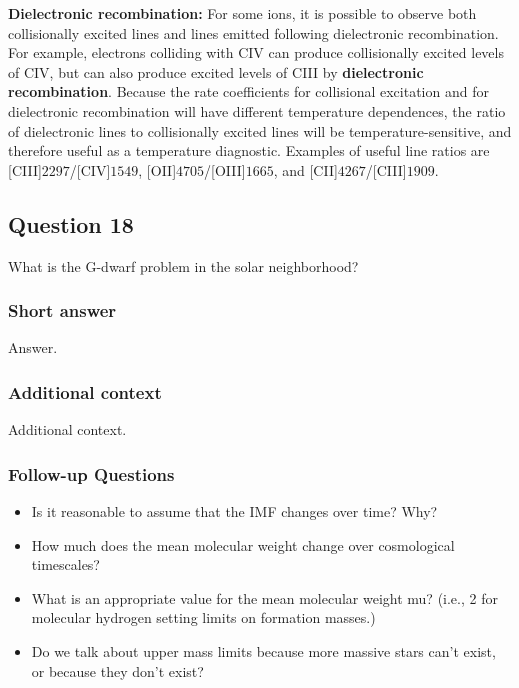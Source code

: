 \documentclass[a4paper,10pt]{article}
\begin{document}
{\noindent}\textbf{Dielectronic recombination:} For some ions, it is possible to observe both collisionally excited lines and lines emitted following dielectronic recombination. For example, electrons colliding with CIV can produce collisionally excited levels of CIV, but can also produce excited levels of CIII by \textbf{dielectronic recombination}. Because the rate coefficients for collisional excitation and for dielectronic recombination will have different temperature dependences, the ratio of dielectronic lines to collisionally excited lines will be temperature-sensitive, and therefore useful as a temperature diagnostic. Examples of useful line ratios are [CIII]$2297$/[CIV]$1549$, [OII]$4705$/[OIII]$1665$, and [CII]$4267$/[CIII]$1909$.



\newpage
\subsection{Question 18}

What is the G-dwarf problem in the solar neighborhood?

\subsubsection{Short answer}

Answer.

\subsubsection{Additional context}

Additional context.

\subsubsection{Follow-up Questions}

\begin{itemize}
    \item Is it reasonable to assume that the IMF changes over time? Why?
    \item How much does the mean molecular weight change over cosmological timescales?
    \item What is an appropriate value for the mean molecular weight mu? (i.e., 2 for molecular hydrogen setting limits on formation masses.)
    \item Do we talk about upper mass limits because more massive stars can't exist, or because they don't exist?
\end{itemize}
\end{document}
